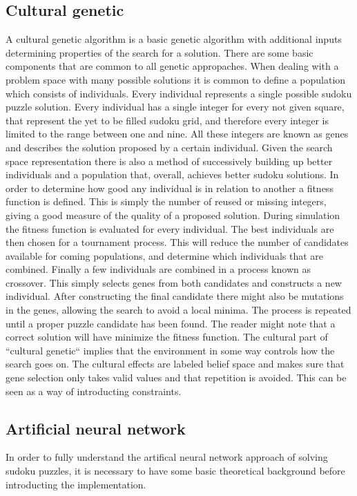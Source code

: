 \documentclass[a4paper,11pt]{kth-mag}
\begin{document}
\subsection{Cultural genetic}
A cultural genetic algorithm is a basic genetic algorithm with additional inputs determining properties of the search for a solution.
 There are some basic components that are common to all genetic appropaches. \newline
When dealing with a problem space with many possible solutions it is common to define a population which consists of individuals.
Every individual represents a single possible sudoku puzzle solution. \cite{stochastic}
Every individual has a single integer for every not given square, that represent the yet to be filled sudoku grid, and therefore every integer is limited to the range between one and nine.
All these integers are known as genes and describes the solution proposed by a certain individual. \newline
Given the search space representation there is also a method of successively building up better individuals and a population that, overall, achieves better sudoku solutions.
In order to determine how good any individual is in relation to another a fitness function is defined.
This is simply the number of reused or missing integers, giving a good measure of the quality of a proposed solution.
During simulation the fitness function is evaluated for every individual.
The best individuals are then chosen for a tournament process.
This will reduce the number of candidates available for coming populations, and determine which individuals that are combined.
Finally a few individuals are combined in a process known as crossover.
This simply selects genes from both candidates and constructs a new individual.
After constructing the final candidate there might also be mutations in the genes, allowing the search to avoid a local minima.
The process is repeated until a proper puzzle candidate has been found.
The reader might note that a correct solution will have minimize the fitness function. \newline
The cultural part of ``cultural genetic`` implies that the environment in some way controls how the search goes on.
The cultural effects are labeled belief space and makes sure that gene selection only takes valid values and that repetition is avoided.
This can be seen as a way of introducting constraints.

\subsection{Artificial neural network}
In order to fully understand the artifical neural network approach of solving sudoku puzzles, it is necessary to have some basic theoretical background before introducting the implementation.
\end{document}
